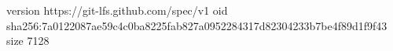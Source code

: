 version https://git-lfs.github.com/spec/v1
oid sha256:7a0122087ae59c4c0ba8225fab827a0952284317d82304233b7be4f89d1f9f43
size 7128
